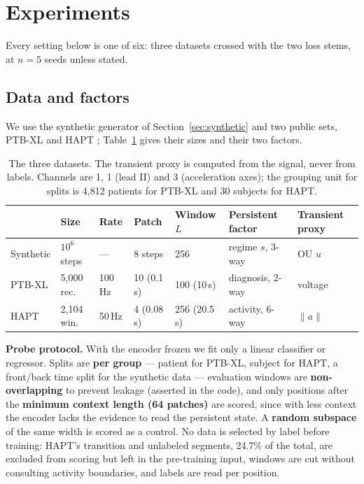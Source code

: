 \section{Experiments}

Every setting below is one of six: three datasets crossed with the two loss stems, at $n=5$ seeds unless stated.

\subsection{Data and factors}
\label{sec:data}

We use the synthetic generator of Section~\ref{sec:synthetic} and two public sets, PTB-XL \citep{wagner2020} and HAPT \citep{reyesortiz2016, hapt2015}; Table~\ref{tab:datasets} gives their sizes and their two factors.

\begin{table}[!htb]
\caption{The three datasets. The transient proxy is computed from the signal, never from labels. Channels are 1, 1 (lead II) and 3 (acceleration axes); the grouping unit for splits is 4,812 patients for PTB-XL and 30 subjects for HAPT.}
\label{tab:datasets}
\centering
\footnotesize
\setlength{\tabcolsep}{4.5pt}
\begin{tabular}{lllllll}
\hline
 & Size & Rate & Patch & Window $L$ & Persistent factor & Transient proxy \\
\hline
Synthetic & $10^6$ steps & --- & 8 steps & 256 & regime $s$, 3-way & OU $u$ \\
PTB-XL & 5,000 rec. & 100\,Hz & 10 (0.1\,s) & 100 (10\,s) & diagnosis, 2-way & voltage \\
HAPT & 2,104 win. & 50\,Hz & 4 (0.08\,s) & 256 (20.5\,s) & activity, 6-way & $\lVert a\rVert$ \\
\hline
\end{tabular}
\end{table}

\textbf{Probe protocol.} With the encoder frozen we fit only a linear classifier or regressor. Splits are \textbf{per group} --- patient for PTB-XL, subject for HAPT, a front/back time split for the synthetic data --- evaluation windows are \textbf{non-overlapping} to prevent leakage (asserted in the code), and only positions after the \textbf{minimum context length (64 patches)} are scored, since with less context the encoder lacks the evidence to read the persistent state. A \textbf{random subspace} of the same width is scored as a control. No data is selected by label before training: HAPT's transition and unlabeled segments, 24.7\% of the total, are excluded from scoring but left in the pre-training input, windows are cut without consulting activity boundaries, and labels are read per position.

